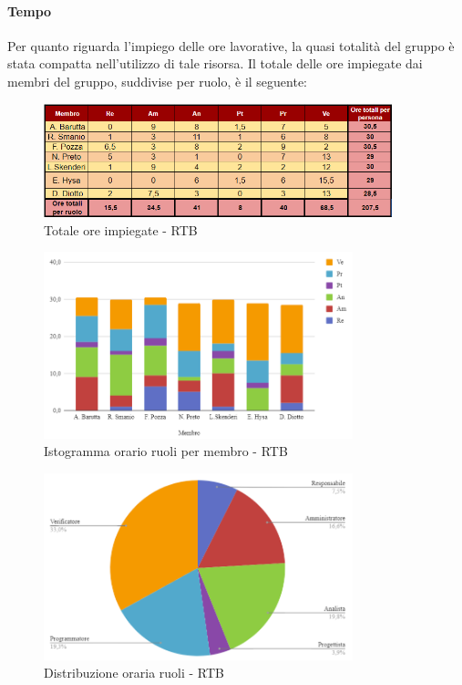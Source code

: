 \paragraph{Tempo}
Per quanto riguarda l’impiego delle ore lavorative, la quasi totalità del gruppo è stata
compatta nell’utilizzo di tale risorsa.
Il totale delle ore impiegate dai membri del gruppo, suddivise per ruolo, è il seguente:
\begin{figure}[H]
    \centering
    \includegraphics[width=0.9\textwidth]{../Images/riepilogoRTBOreMembro.png}
    \caption{Totale ore impiegate - RTB}
    \label{fig:Tot_oreRTB}
\end{figure}
\begin{figure}[H]
    \centering
    \includegraphics[width=0.8\textwidth]{../Images/graficoOrarioRuoloRTB.png}
    \caption{Istogramma orario ruoli per membro  - RTB}
    \label{fig:GraficoOreRTB}
\end{figure}
\begin{figure}[H]
    \centering
    \includegraphics[width=0.8\textwidth]{../Images/distribuzioneOrariaRTBRuoli.png}
    \caption{Distribuzione oraria ruoli  - RTB}
    \label{fig:GraficoDistribuzioneOreRTB}
\end{figure}


